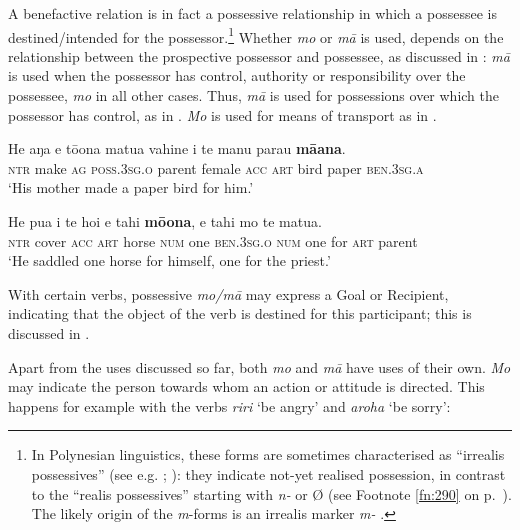 A benefactive relation is in fact a possessive relationship in which a possessee is destined/intended for the possessor.\footnote{\label{fn:235}In Polynesian linguistics, these forms are sometimes characterised as “irrealis possessives” (see e.g. \citealt{Clark2000Possessive}; \citealt[48]{Wilson1982}): they indicate not-yet realised possession, in contrast to the “realis possessives” starting with \textit{n-} or Ø (see Footnote \ref{fn:290} on p.~\pageref{fn:290}). The likely origin of the \textit{m}{}-forms is an irrealis marker \textit{m-} \citep[115]{Clark1976}.} Whether \textit{mo} or \textit{mā} is used, depends on the relationship between the prospective possessor and possessee, as discussed in : \textit{mā} is used when the possessor has control, authority or responsibility over the possessee, \textit{mo} in all other cases. Thus, \textit{mā} is used for possessions over which the possessor has control, as in . \textit{Mo} is used for means of transport as in .

\ea\label{ex:4.284}
\gll He aŋa e tō{\ꞌ}ona matu{\ꞌ}a vahine i te manu parau \textbf{mā{\ꞌ}ana}.\\
 \textsc{ntr} make \textsc{ag} \textsc{poss.3sg.o} parent female \textsc{acc} \textsc{art} bird paper \textsc{ben.3sg.a}\\

\glt 
‘His mother made a paper bird for him.’ \textstyleExampleref{[R476.002]} 
\z

\ea\label{ex:4.285}
\gll He pu{\ꞌ}a i te hoi e tahi \textbf{mō{\ꞌ}ona}, e tahi mo te matu{\ꞌ}a.\\
\textsc{ntr} cover \textsc{acc} \textsc{art} horse \textsc{num} one \textsc{ben.3sg.o} \textsc{num} one for \textsc{art} parent\\

\glt 
‘He saddled one horse for himself, one for the priest.’ \textstyleExampleref{[R167.001]} 
\z

With certain verbs, possessive \textit{mo/mā} may express a Goal or Recipient, indicating that the object of the verb is destined for this participant; this is discussed in . 

Apart from the uses discussed so far, both \textit{mo} and \textit{mā} have uses of their own. \textit{Mo} may indicate the person towards whom an action or attitude is directed. This happens for example with the verbs \textit{riri} ‘be angry’ and \textit{{\ꞌ}aroha} ‘be sorry’:

